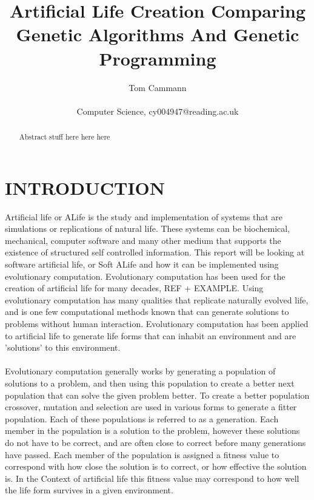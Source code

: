 \documentclass[10pt,twocolumn]{article}
\begin{document}
\title{Artificial Life Creation Comparing Genetic Algorithms And Genetic Programming}
\author{Tom Cammann\\\\
Computer Science, cy004947@reading.ac.uk}
\date{}
\maketitle
\begin{abstract}

	Abstract stuff here here here
\end{abstract}


\section{INTRODUCTION}

Artificial life or ALife is the study and implementation of systems that are simulations or replications of natural life.
These systems can be biochemical, mechanical, computer software and many other medium that supports the existence of structured self controlled information.
This report will be looking at software artificial life, or Soft ALife and how it can be implemented using evolutionary computation.
Evolutionary computation has been used for the creation of artificial life for many decades, REF + EXAMPLE.
Using evolutionary computation has many qualities that replicate naturally evolved life, and is one few computational methods known that can generate solutions to problems without human interaction.
Evolutionary computation has been applied to artificial life to generate life forms that can inhabit an environment and are 'solutions' to this environment.

\paragraph{}
Evolutionary computation generally works by generating a population of solutions to a problem, and then using this population to create a better next population that can solve the given problem better.
To create a better population crossover, mutation and selection are used in various forms to generate a fitter population.
Each of these populations is referred to as a generation.
Each member in the population is a solution to the problem, however these solutions do not have to be correct, and are often close to correct before many generations have passed.
Each member of the population is assigned a fitness value to correspond with how close the solution is to correct, or how effective the solution is.
In the Context of artificial life this fitness value may correspond to how well the life form survives in a given environment.
\end{document}
